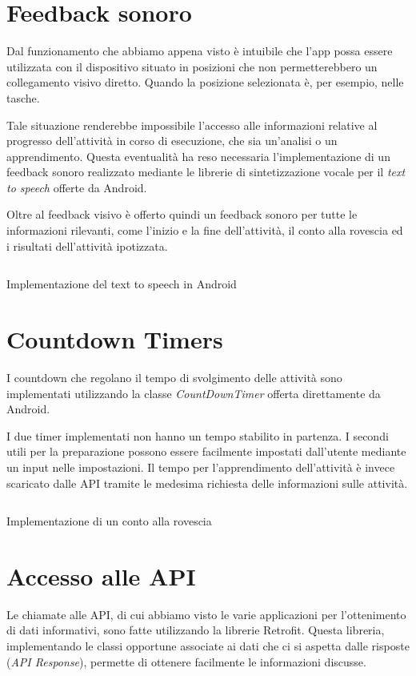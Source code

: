 \section{Feedback sonoro}
Dal funzionamento che abbiamo appena visto è intuibile che l'app possa essere utilizzata con il dispositivo situato in posizioni che non permetterebbero
un collegamento visivo diretto. Quando la posizione selezionata è, per esempio, nelle tasche.

Tale situazione renderebbe impossibile l'accesso alle informazioni relative al progresso dell'attività in corso di esecuzione, che sia 
un'analisi o un apprendimento.
Questa eventualità ha reso necessaria l'implementazione di un feedback sonoro realizzato mediante le librerie 
di sintetizzazione vocale per il \textit{text to speech} \cite{tts} offerte da Android.

Oltre al feedback visivo è offerto quindi un feedback sonoro per tutte le informazioni rilevanti, come l'inizio e la fine dell'attività, 
il conto alla rovescia ed i risultati dell'attività ipotizzata.

\begin{listing}[H] 
    \inputminted[frame=single,framesep=10pt]{java}{snippets/app/voice.java}
    \caption{Implementazione del text to speech in Android}
\end{listing}



\section{Countdown Timers}
I countdown che regolano il tempo di svolgimento delle attività sono implementati utilizzando la 
classe \textit{CountDownTimer} \cite{countdown} offerta direttamente da Android.

I due timer implementati non hanno un tempo stabilito in partenza. I secondi utili per la preparazione possono essere facilmente
impostati dall'utente mediante un input nelle impostazioni. Il tempo per l'apprendimento dell'attività è invece scaricato dalle API
tramite le medesima richiesta delle informazioni sulle attività.

\begin{listing}[H] 
    \inputminted[frame=single,framesep=10pt]{java}{snippets/app/countdown.java}
    \caption{Implementazione di un conto alla rovescia}
\end{listing}



\section{Accesso alle API}
Le chiamate alle API, di cui abbiamo visto le varie applicazioni per l'ottenimento di dati informativi, 
sono fatte utilizzando la librerie Retrofit. Questa libreria, implementando le classi opportune associate ai dati
che ci si aspetta dalle risposte (\textit{API Response}), permette di ottenere facilmente le informazioni discusse.
